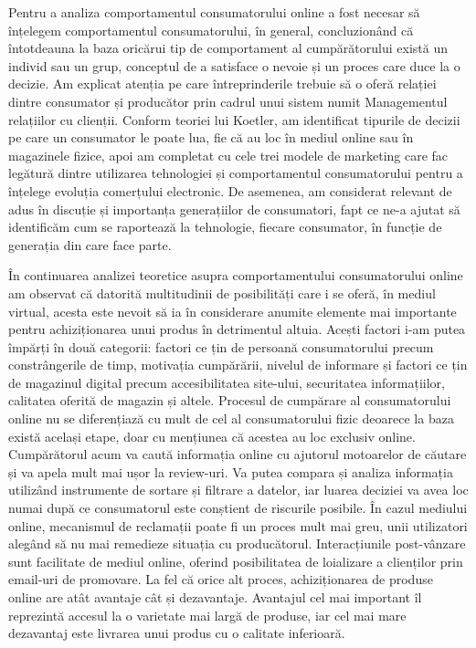 \documentclass[a4paper, 12pt]{article}
\begin{document}
	\quad Pentru a analiza comportamentul consumatorului online a fost necesar să înțelegem comportamentul consumatorului, în general, concluzionând că întotdeauna la baza oricărui tip de comportament al cumpărătorului există un individ sau un grup, conceptul de a satisface o nevoie și un proces care duce la o decizie. Am explicat atenția pe care întreprinderile trebuie să o oferă relației dintre consumator și producător prin cadrul unui sistem numit Managementul relațiilor cu clienții. Conform teoriei lui Koetler, am identificat tipurile de decizii pe care un consumator le poate lua, fie că au loc în mediul online sau în magazinele fizice, apoi am completat cu cele trei modele de marketing care fac legătură dintre utilizarea tehnologiei și comportamentul consumatorului pentru a înțelege evoluția comerțului electronic. De asemenea, am considerat relevant de adus în discuție și importanța generațiilor de consumatori, fapt ce ne-a ajutat să identificăm cum se raportează la  tehnologie, fiecare consumator, în funcție de generația din care face parte.
	 
	\quad În continuarea analizei teoretice asupra comportamentului consumatorului online am observat că datorită multitudinii de posibilități care i se oferă, în mediul virtual, acesta este nevoit să ia în considerare anumite elemente mai importante pentru achiziționarea unui produs în detrimentul altuia. Acești factori i-am putea împărți în două categorii: factori ce țin de persoană consumatorului precum constrângerile de timp, motivația cumpărării, nivelul de informare și factori ce țin de magazinul digital precum accesibilitatea site-ului, securitatea informațiilor, calitatea oferită de magazin și altele. Procesul de cumpărare al consumatorului online nu se diferențiază cu mult de cel al consumatorului fizic deoarece la baza există același etape, doar cu mențiunea că acestea au loc exclusiv online. Cumpărătorul acum va caută informația online cu ajutorul motoarelor de căutare și va apela mult mai ușor la review-uri. Va putea compara și analiza informația utilizând instrumente de sortare și filtrare a datelor, iar luarea deciziei va avea loc numai după ce consumatorul este conștient de riscurile posibile. În cazul mediului online, mecanismul de reclamații poate fi un proces mult mai greu, unii utilizatori alegând să nu mai remedieze situația cu producătorul. Interacțiunile post-vânzare sunt facilitate de mediul online, oferind posibilitatea de loializare a clienților prin email-uri de promovare. La fel că orice alt proces, achiziționarea de produse online are atât avantaje cât și dezavantaje. Avantajul cel mai important îl reprezintă accesul la o varietate mai largă de produse, iar cel mai mare dezavantaj este livrarea unui produs cu o calitate inferioară.
	
\end{document}
